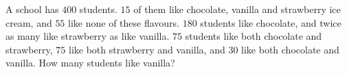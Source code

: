 A school has $400$ students. $15$ of them like chocolate, vanilla and strawberry ice cream, and $55$ like none of these flavours. $180$ students like chocolate, and twice as many like strawberry as like vanilla. $75$ students like both chocolate and strawberry, $75$ like both strawberry and vanilla, and $30$ like both chocolate and vanilla. How many students like vanilla?
